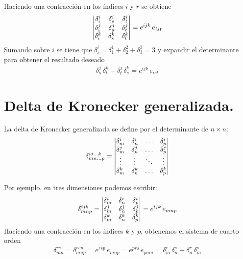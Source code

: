 \documentclass[hidelinks,12pt]{article}
\begin{document}
Haciendo una contracción en los índices $i$ y $r$ se obtiene
\begin{align*}
    \mqty|
        \delta_{i}^{i} & \delta_{s}^{i} & \delta_{t}^{i} \\
        \delta_{i}^{j} & \delta_{s}^{j} & \delta_{t}^{j} \\
        \delta_{i}^{k} & \delta_{s}^{k} & \delta_{t}^{k} \\
    | = e^{ijk} \, e_{ist}
\end{align*}
Sumando sobre $i$ se tiene que $\delta_{i}^{i} = \delta_{1}^{1} + \delta_{2}^{2} + \delta_{3}^{3} = 3$ y expandir el determinante para obtener el resultado deseado
\begin{align*}
    \delta_{s}^{j} \, \delta_{t}^{k} - \delta_{t}^{j} \, \delta_{s}^{k} = e^{ijk} \, e_{ist}
\end{align*}

\section{Delta de Kronecker generalizada.}

La delta de Kronecker generalizada se define por el determinante de $n \times n$:
\begin{align*}
\delta_{m n \ldots p}^{i j \ldots k} = \mqty|
\delta_{m}^{i} & \delta_{n}^{i} & \ldots & \delta_{p}^{i} \\
\delta_{m}^{j} & \delta_{n}^{j} & \ldots & \delta_{p}^{j} \\
\vdots & \vdots & \ddots & \vdots \\
\delta_{m}^{k} & \delta_{n}^{k} & \ldots & \delta_{p}^{k} |
\end{align*}

Por ejemplo, en tres dimensiones podemos escribir:
\begin{align*}
\delta_{m n p}^{i j k} = \mqty|
\delta_{m}^{i} & \delta_{n}^{i} & \delta_{p}^{i} \\
\delta_{m}^{j} & \delta_{n}^{j} & \delta_{p}^{j} \\
\delta_{m}^{k} & \delta_{n}^{k} & \delta_{p}^{k}| =
e^{ijk} \, e_{mnp}
\end{align*}
Haciendo una contracción en los índices $k$ y $p$, obtenemos el sistema de cuarto orden
\begin{align*}
    \delta_{mn}^{rs} = \delta_{mnp}^{rsp} = e^{rsp} \, e_{mnp} = e^{prs} \, e_{pmn} = \delta_{m}^{r} \, \delta_{n}^{s} - \delta_{n}^{r} \, \delta_{m}^{s}
\end{align*}
\end{document}
